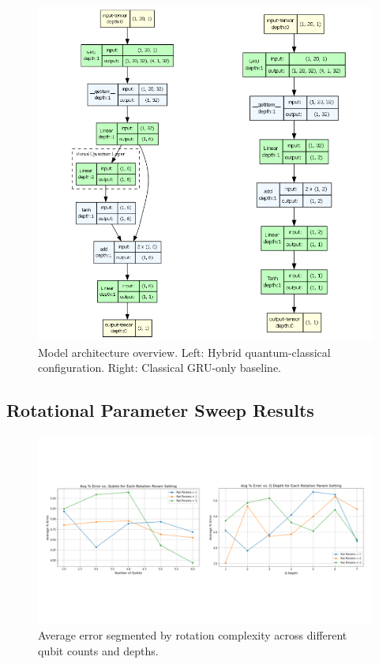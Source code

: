 \documentclass[10pt]{article}
\begin{document}
\begin{figure}[H]
    \centering
    \includegraphics[trim=0cm 0cm 0cm 0cm, clip, width=0.85\linewidth]{images/model architecture.png}
    \caption{Model architecture overview. Left: Hybrid quantum-classical configuration. Right: Classical GRU-only baseline.}
    \label{fig:classical-vs-quantum}
\end{figure}

\subsection{Rotational Parameter Sweep Results}
\label{appendix:rotational-sweep}

\begin{figure}[H]
    \centering
    \includegraphics[trim=0cm 6cm 0cm 6cm,clip,width=1\linewidth]{images/quantum rotations.png}
    \caption{Average error segmented by rotation complexity across different qubit counts and depths.}
\end{figure}
\end{document}
